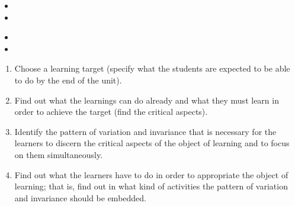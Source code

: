 \begin{frame}
  \begin{remark}
    \begin{itemize}
      \item<+> 
      \item<+> 
    \end{itemize}
  \end{remark}
\end{frame}

\begin{frame}
  \begin{remark}
    \begin{itemize}
      \item<+> 

      \item<+> 
    \end{itemize}
  \end{remark}
\end{frame}

\begin{frame}
  \begin{example}
    \begin{enumerate}
      \item<+> Choose a learning target (specify what the students are expected 
        to be able to do by the end of the unit).
      \item<+> Find out what the learnings can do already and what they must 
        learn in order to achieve the target (find the critical aspects).
      \item<+> Identify the pattern of variation and invariance that is 
        necessary for the learners to discern the critical aspects of the 
        object of learning and to focus on them simultaneously.
      \item<+> Find out what the learners have to do in order to appropriate 
        the object of learning; that is, find out in what kind of activities 
        the pattern of variation and invariance should be embedded.
        \saveenumi
    \end{enumerate}
  \end{example}
\end{frame}

